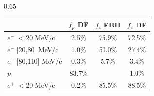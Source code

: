 \documentclass{beamer}
\begin{document}
\begin{frame}
\begin{columns}
\begin{column}{0.65\framewidth}
\begin{table}[h!]
        \end{table}
        \vspace{-6mm}
        \begin{table}[h!]
    \centering
            \hspace*{-0.5em}
    \renewcommand{\arraystretch}{0.7}
    \begin{tabular}{| l | c | c | c |} 
    \hline
    &    {\scriptsize $f_{p}$ DF} & {\scriptsize $f_{e}$ FBH } & {\scriptsize $f_{e}$ DF} \\
    \hline
    {\scriptsize $e^-$} {\tiny$<$20 MeV/c}      & {\scriptsize 2.5\%}   & {\scriptsize 75.9\%} & {\scriptsize 72.5\%}\\
    \hline
    {\scriptsize $e^-$} {\tiny[20,80] MeV/c}  & {\scriptsize 1.0\%}   & {\scriptsize 50.0\%} & {\scriptsize 27.4\%} \\
    \hline
    {\scriptsize $e^-$} {\tiny[80,110] MeV/c}  & {\scriptsize 0.3\%}  &  {\scriptsize 5.7\%} & {\scriptsize 3.4\%}\\
    \hline
    {\scriptsize $p$}       &         {\scriptsize 83.7\%}   &  & {\scriptsize 1.0\%}\\
    \hline
    {\scriptsize $e^+$} {\tiny$<$20 MeV/c} & {\scriptsize 0.2\%}    &   {\scriptsize 85.5\%}& {\scriptsize 88.5\%}\\
    \hline


\end{tabular}
\end{table}
\end{column}
\end{columns}
\end{frame}
\end{document}
